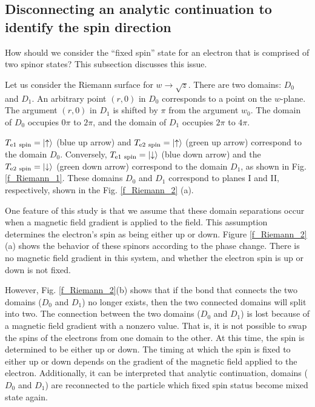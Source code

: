 \documentclass[reprint,amsmath,amssymb,aps,]{revtex4-1}
\numberwithin{equation}{section}%
\begin{document}
\subsection{\label{sec:Disconnecting an analytic continuation to identify the spin direction}Disconnecting an analytic continuation to identify the spin direction}


    How should we consider the ``fixed spin'' state for an electron that is comprised of two spinor states? This subsection discusses this issue.
    
    Let us consider the Riemann surface for $w \rightarrow \sqrt{z}$. There are two domains: $D_{0}$ and $D_{1}$. An arbitrary point $(r, 0)$ in $D_{0}$ corresponds to a point on the $w$-plane. The argument $(r, 0)$ in $D_{1}$ is shifted by $\pi$ from the argument $w_{0}$. The domain of $D_{0}$ occupies $0\pi$ to $2\pi$, and the domain of $D_{1}$ occupies $2\pi$ to $4\pi$.

    $T_{\mathrm{e1 \ spin}} = \ket{\uparrow}$ (blue up arrow) and $T_{\mathrm{e2 \ spin}} = \ket{\uparrow}$ (green up arrow) correspond to the domain $D_{0}$. Conversely, $T_{\mathrm{e1 \ spin}} = \ket{\downarrow}$ (blue down arrow) and the $T_{\mathrm{e2 \ spin}} = \ket{\downarrow}$ (green down arrow) correspond to the domain $D_{1}$, as shown in  Fig. \ref{f_Riemann_1}. These domains $D_{0}$ and $D_{1}$ correspond to planes I and II, respectively, shown in the Fig. \ref{f_Riemann_2} (a).

    One feature of this study is that we assume that these domain separations occur when a magnetic field gradient is applied to the field. This assumption determines the electron's spin as being either up or down. Figure \ref{f_Riemann_2}(a) shows the behavior of these spinors according to the phase change. There is no magnetic field gradient in this system, and whether the electron spin is up or down is not fixed.

    However, Fig. \ref{f_Riemann_2}(b) shows that if the bond that connects the two domains ($D_{0}$ and $D_{1}$) no longer exists, then the two connected domains will split into two. The connection between the two domains ($D_{0}$ and $D_{1}$) is lost because of a magnetic field gradient with a nonzero value. That is, it is not possible to swap the spins of the electrons from one domain to the other. At this time, the spin is determined to be either up or down. The timing at which the spin is fixed to either up or down depends on the gradient of the magnetic field applied to the electron. Additionally, it can be interpreted that analytic continuation, domains ($D_{0}$ and $D_{1}$) are reconnected to the particle which fixed spin status become mixed state again.
\end{document}
